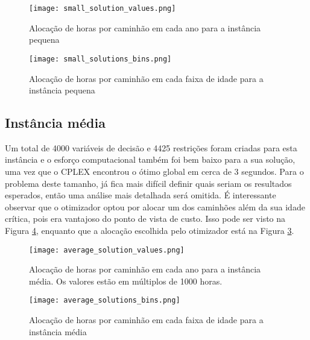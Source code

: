 \documentclass[conference]{IEEEtran}
\begin{document}
\begin{figure}[h!]
	\centering
	\texttt{[image: small\_solution\_values.png]}
	\caption{Alocação de horas por caminhão em cada ano para a instância pequena}
	\label{fig:small_solution_values}
\end{figure}

\begin{figure}[h!]
	\centering
	\texttt{[image: small\_solutions\_bins.png]}
	\caption{Alocação de horas por caminhão em cada faixa de idade para a instância pequena}
	\label{fig:small_solutions_bins}
\end{figure}

\subsection{Instância média}

Um total de 4000 variáveis de decisão e 4425 restrições foram criadas para esta instância e o esforço computacional também foi bem baixo para a sua solução, uma vez que o CPLEX encontrou o ótimo global em cerca de 3 segundos. Para o problema deste tamanho, já fica mais difícil definir quais seriam os resultados esperados, então uma análise mais detalhada será omitida. É interessante observar que o otimizador optou por alocar um dos caminhões além da sua idade crítica, pois era vantajoso do ponto de vista de custo. Isso pode ser visto na Figura \ref{fig:average_solutions_bins}, enquanto que a alocação escolhida pelo otimizador está na Figura \ref{fig:average_solution_values}.


\begin{figure}[h!]
	\centering
	\texttt{[image: average\_solution\_values.png]}
	\caption{Alocação de horas por caminhão em cada ano para a instância média. Os valores estão em múltiplos de 1000 horas.}
	\label{fig:average_solution_values}
\end{figure}

\begin{figure}[h!]
	\centering
	\texttt{[image: average\_solutions\_bins.png]}
	\caption{Alocação de horas por caminhão em cada faixa de idade para a instância média}
	\label{fig:average_solutions_bins}
\end{figure}
\end{document}
